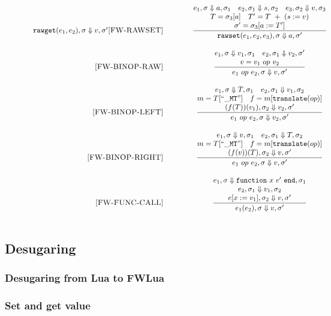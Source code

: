 \documentclass{article}
\begin{document}
\begin{figure}[P]
\[\begin{array}{r@{\qquad\qquad}c}
{}{
  \semanticFull {{\tt rawget}(e_1,e_2)} {\sigma}   {v} {\sigma'}
}
\ssrule{FW-RAWSET}{
  \semanticFull{e_1}{\sigma}{a}{\sigma_1} \quad
  \semanticFull{e_2}{\sigma_1}{s}{\sigma_2} \quad
  \semanticFull{e_3}{\sigma_2}{v}{\sigma_3} \\
  T = \sigma_3[a] \quad
  T' = T~+~(s := v) \\
  \sigma' = \sigma_3[a:=T']
}{
  \semanticFull{{\tt rawset}(e_1,e_2,e_3)}{\sigma}{a}{\sigma'}
}
\ssrule{FW-BINOP-RAW}{
  \semanticFull{e_1}{\sigma}{v_1}{\sigma_1} \quad
  \semanticFull{e_2}{\sigma_1}{v_2}{\sigma'} \\
  v = v_1 ~op~ v_2
}{
  \semanticFull{e_1 ~op~ e_2}{\sigma}{v}{\sigma'}
}
\ssrule{FW-BINOP-LEFT}{
  \semanticFull{e_1}{\sigma}{T}{\sigma_1} \quad
  \semanticFull{e_2}{\sigma_1}{v_1}{\sigma_2} \\
  m = T[{\tt ``{\_}MT"}]\quad
  f = m[{\tt translate}(op)]\\
   \semanticFull{(f(T))(v_1)}  {\sigma_2}    {v_2} {\sigma'} \\
}{
  \semanticFull{e_1 ~op~ e_2}{\sigma}{v_2}{\sigma'}
}
\ssrule{FW-BINOP-RIGHT}{
  \semanticFull{e_1}{\sigma}{v}{\sigma_1} \quad
  \semanticFull{e_2}{\sigma_1}{T}{\sigma_2} \\
  m = T[{\tt ``{\_}MT"}]\quad
  f = m[{\tt translate}(op)]\\
   \semanticFull{(f(v))(T)}  {\sigma_2}    {v} {\sigma'} \\
}{
  \semanticFull{e_1 ~op~ e_2}{\sigma}{v}{\sigma'}
}
\ssrule{FW-FUNC-CALL}{
  \semanticFull{e_1}{\sigma}{{\tt function} ~x ~e' ~{\tt end}}{\sigma_1} \\
  \semanticFull{e_2}{\sigma_1}{v_1}{\sigma_2} \\
  \semanticFull{e[x:=v_1]}{\sigma_2}{v}{\sigma'} 
}{
  \semanticFull{e_1(e_2)}{\sigma}{v}{\sigma'} 
}
\end{array}
\]
\end{figure}

\subsection{Desugaring}
\subsubsection{Desugaring from Lua to FWLua}
\subsubsection{Set and get value}
\end{document}
